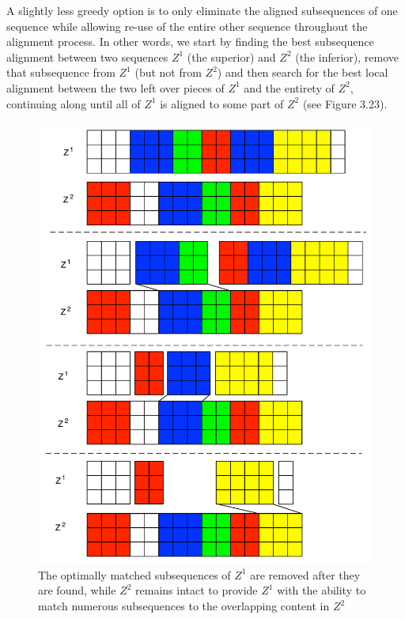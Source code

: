 \documentclass[a4paper,12pt]{report} 	%
\numberwithin{figure}{chapter}
\numberwithin{table}{chapter}
\numberwithin{equation}{chapter}
\begin{document}
\begin{flushleft}
A slightly less greedy option is to only eliminate the aligned subsequences of one sequence while allowing re-use of the entire other sequence throughout the alignment process. In other words, we start by finding the best subsequence alignment between two sequences $Z^1$ (the superior) and $Z^2$ (the inferior), remove that subsequence from $Z^1$ (but not from $Z^2$) and then search for the best local alignment between the two left over pieces of $Z^1$ and the entirety of $Z^2$, continuing along until all of $Z^1$ is aligned to some part of $Z^2$ (see Figure 3.23). 
\begin{figure}[h!]
\begin{center}
\includegraphics[scale=0.65]{GreedyMatching2}
\caption[Asymmetric Greedy Removal After Matching]{The optimally matched subsequences of $Z^1$ are removed after they are found, while $Z^2$ remains intact to provide $Z^1$ with the ability to match numerous subsequences to the overlapping content in $Z^2$}
\end{center}

\end{figure}
\end{flushleft}
\end{document}
